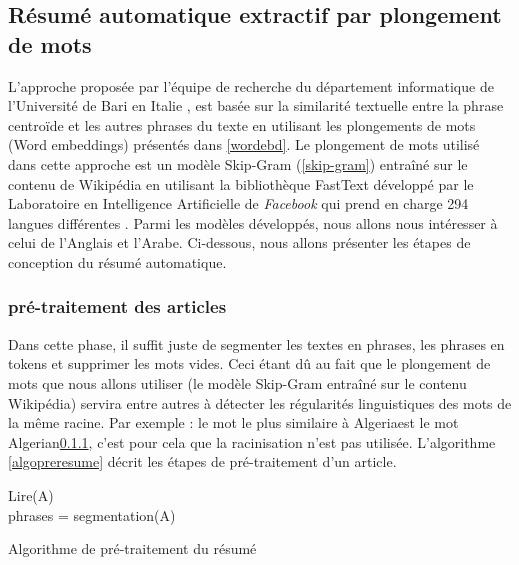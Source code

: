     \subsection{Résumé automatique extractif par plongement de mots}
    L'approche proposée par l'équipe de recherche du département informatique de l'Université de Bari en Italie \cite{notrerésumé}, est basée sur la similarité textuelle entre la phrase centroïde et les autres phrases du texte en utilisant les plongements de mots (Word embeddings) présentés dans \autoref{wordebd}. Le plongement de mots utilisé dans cette approche est un modèle Skip-Gram (\autoref{skip-gram}) entraîné sur le contenu de Wikipédia en utilisant la bibliothèque FastText développé par le Laboratoire en Intelligence Artificielle de \emph{Facebook} qui prend en charge 294 langues différentes \cite{fasttext}. Parmi les modèles développés, nous allons nous intéresser à celui de l'Anglais et l'Arabe. Ci-dessous, nous allons présenter les étapes de conception du résumé automatique.

        \subsubsection{pré-traitement des articles}
        Dans cette phase, il suffit juste de segmenter les textes en phrases, les phrases en tokens et supprimer les mots vides. Ceci étant dû au fait que le plongement de mots que nous allons utiliser (le modèle Skip-Gram entraîné sur le contenu Wikipédia) servira entre autres à détecter les régularités linguistiques des  mots de la même racine. Par exemple : le mot le plus similaire à \textquotedbl Algeria\textquotedbl est le mot \textquotedbl Algerian\textquotedbl \ref{}, c'est pour cela que la racinisation n'est pas utilisée. L'algorithme \autoref{algopreresume} décrit les étapes de pré-traitement d'un article.

         \begin{algorithm2e}[H]
          \label{algopreresume}
          \SetAlgoLined
          Lire(A)\\
          phrases = segmentation(A)\\
         \caption{Algorithme de pré-traitement du résumé}
        \end{algorithm2e}


